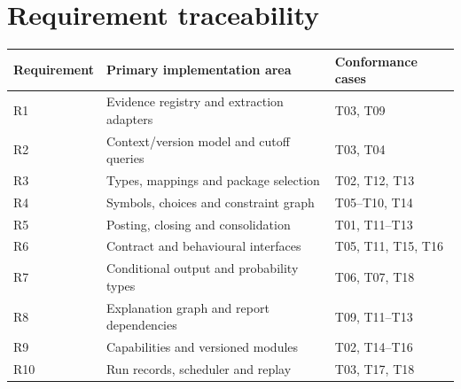\section{Requirement traceability}

\begin{center}
\begin{tabular}{lll}
\toprule Requirement & Primary implementation area & Conformance cases\\\midrule
R1 & Evidence registry and extraction adapters & T03, T09\\
R2 & Context/version model and cutoff queries & T03, T04\\
R3 & Types, mappings and package selection & T02, T12, T13\\
R4 & Symbols, choices and constraint graph & T05--T10, T14\\
R5 & Posting, closing and consolidation & T01, T11--T13\\
R6 & Contract and behavioural interfaces & T05, T11, T15, T16\\
R7 & Conditional output and probability types & T06, T07, T18\\
R8 & Explanation graph and report dependencies & T09, T11--T13\\
R9 & Capabilities and versioned modules & T02, T14--T16\\
R10 & Run records, scheduler and replay & T03, T17, T18\\\bottomrule
\end{tabular}
\end{center}
